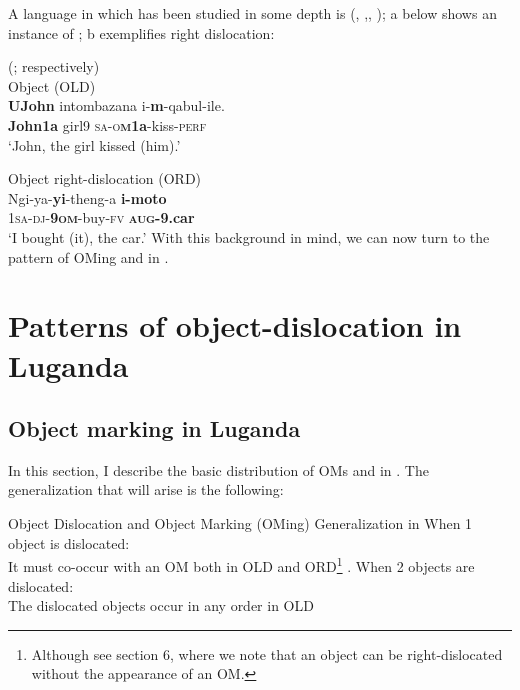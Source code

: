 \documentclass[output=paper
,newtxmath
,modfonts
,nonflat]{langsci/langscibook}
\begin{document}
A  language in which  has been studied in some depth is  (\citealt{vanderSpuy1993}, \citealt{ChengDowning2009},\citealt{zeller2009,Zeller2015}, \citealt{Halpert2015}); a below shows an instance of ; b exemplifies right dislocation:

\ea\label{ex:ranero:6}
 (\citealt{zeller2009}; \citealt{Zeller2015} respectively)\\
\ea\label{ex:ranero:6a} Object  (OLD)\\
\gll \textbf{UJohn}   intombazana i-\textbf{m}{}-qabul-ile.\\
\textbf{John1a}  girl9      \textsc{sa-o}\textbf{\textsc{m}}\textbf{1a}{}-kiss-\textsc{perf}\\
\glt ‘John, the girl kissed (him).’

\ex\label{ex:ranero:6b}  Object right-dislocation (ORD)\\
\gll Ngi-ya-\textbf{yi}{}-theng-a     \textbf{i-moto}\\
1\textsc{sa}{}-\textsc{dj}{}-\textbf{9\textsc{om}}{}-buy-\textsc{fv} \textbf{\textsc{aug}}\textbf{{}-9.car}\\
\glt ‘I bought (it), the car.’
\z
\z
With this background in mind, we can now turn to the pattern of OMing and  in .

\section{Patterns of object-dislocation in Luganda}\label{sec:ranero:3}
\subsection{Object marking in Luganda}\label{sec:ranero:3.1}

In this section, I describe the basic distribution of OMs and  in . The generalization that will arise is the following:

\ea\label{ex:ranero:7}
Object Dislocation and Object Marking (OMing) Generalization in 
\ea\label{ex:ranero:7a}
When 1 object is dislocated:\\
\ea\label{ex:ranero:7ai}  It must co-occur with an OM both in OLD and ORD\footnote{Although see section 6, where we note that an object can be right-dislocated without the appearance of an OM.} .
\z
\ex\label{ex:ranero:7b}  
When 2 objects are dislocated:\\
\ea\label{ex:ranero:7bi}  The dislocated objects occur in any order in OLD\\
\end{document}
